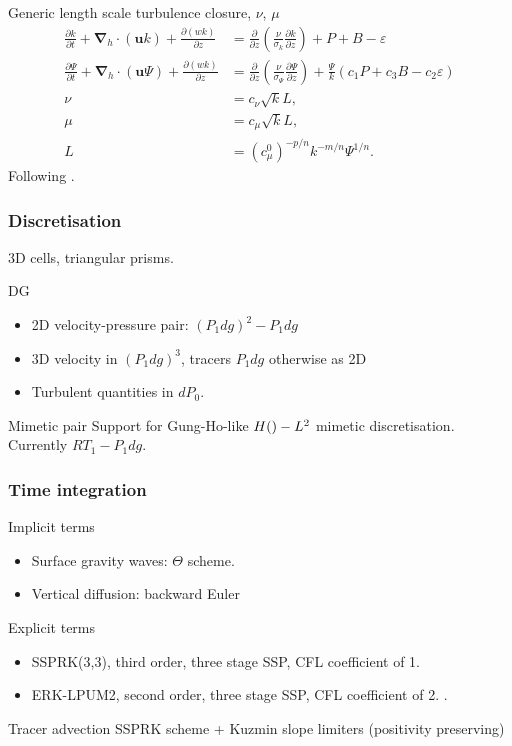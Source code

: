 \documentclass{beamer}
\renewcommand{\vec}[1]{\ensuremath{\boldsymbol{#1}}}
\newcommand{\ddt}[1]{\frac{\partial #1}{\partial t}}
\newcommand{\dd}[2]{\frac{\partial #1}{\partial #2}}
\newcommand{\nablah}{\ensuremath{\vec{\nabla}_{\!\!h}}}
\let\div\relax
\DeclareMathOperator{\div}{div}
\begin{document}
\begin{frame}[allowframebreaks]
\begin{block}{Generic length scale turbulence closure, $\nu$, $\mu$}
  \begin{align*}
    \ddt{k} + \nablah \cdot (\vec{u} k) + \dd{(w k)}{z} &= \dd{}{z}\left(\frac{\nu}{\sigma_k} \dd{k}{z}\right) + P + B - \varepsilon\\
    \dd{\Psi}{t} + \nablah \cdot (\vec{u} \Psi) + \dd{(w k)}{z} &= \dd{}{z}\left(\frac{\nu}{\sigma_\Psi} \dd{\Psi}{z}\right) + \frac{\Psi}{k}(c_1 P + c_3 B - c_2 \varepsilon) \\
    \nu &= c_\nu \sqrt{k} L, \\
    \mu &= c_{\mu} \sqrt{k} L, \\
    L &= \left(c_\mu^0\right)^{-p/n} k^{-m/n} \Psi^{1/n}.
  \end{align*}
  Following \cite{Umlauf:2003}.
\end{block}
\end{frame}

\begin{frame}
  \frametitle{Discretisation}
  3D cells, triangular prisms.
  \begin{block}{DG}
    \begin{itemize}
    \item 2D velocity-pressure pair: $(P_1dg)^2-P_1dg$
    \item 3D velocity in $(P_1dg)^3$, tracers $P_1dg$ otherwise as 2D
    \item Turbulent quantities in $dP_0$.
    \end{itemize}
  \end{block}
  \begin{block}{Mimetic pair}
    Support for Gung-Ho-like $H(\div)-L^2$ mimetic discretisation.
    Currently $RT_1-P_1dg$.
  \end{block}
\end{frame}


\begin{frame}[t]
  \frametitle{Time integration}
  \begin{block}{Implicit terms}
    \begin{itemize}
    \item Surface gravity waves: $\Theta$ scheme.
    \item Vertical diffusion: backward Euler
    \end{itemize}
  \end{block}
  \begin{block}{Explicit terms}
    \begin{itemize}
    \item SSPRK(3,3), third order, three stage SSP, CFL coefficient of 1.
    \item ERK-LPUM2, second order, three stage SSP, CFL coefficient of
      2.  \cite{Higueras:2014}.
    \end{itemize}
  \end{block}
  \begin{block}{Tracer advection}
    SSPRK scheme + Kuzmin slope limiters (positivity preserving)
  \end{block}
\end{frame}
\end{document}
